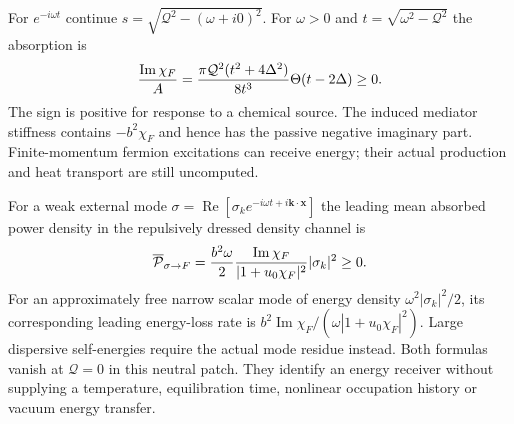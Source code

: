 \documentclass[11pt]{article}
\begin{document}
For $e^{-i\omega t}$ continue
$s=\sqrt{\mathcal Q^2-(\omega+i0)^2}$. For $\omega>0$ and
$t=\sqrt{\omega^2-\mathcal Q^2}$ the absorption is
\begin{equation}
 {\operatorname{Im}\chi_F\over A}
 ={\pi\mathcal Q^2(t^2+4\Delta^2)\over8t^3}
                 \Theta(t-2\Delta)\geq0.
\end{equation}
The sign is positive for response to a chemical source. The induced
mediator stiffness contains $-b^2\chi_F$ and hence has the passive
negative imaginary part. Finite-momentum fermion excitations can receive
energy; their actual production and heat transport are still uncomputed.

For a weak external mode $\sigma=\operatorname{Re}[\sigma_k
e^{-i\omega t+i\mathbf k\cdot\mathbf x}]$ the leading mean absorbed power
density in the repulsively dressed density channel is
\begin{equation}
 \overline{\mathcal P}_{\sigma\to F}
 ={b^2\omega\over2}{\operatorname{Im}\chi_F\over
                    |1+u_0\chi_F|^2}|\sigma_k|^2\geq0.
\end{equation}
For an approximately free narrow scalar mode of energy density
$\omega^2|\sigma_k|^2/2$, its corresponding leading energy-loss rate is
$b^2\operatorname{Im}\chi_F/(\omega|1+u_0\chi_F|^2)$.
Large dispersive self-energies require the actual mode residue instead.
Both formulas vanish at $\mathcal Q=0$ in this neutral patch. They identify
an energy receiver without supplying a temperature, equilibration time,
nonlinear occupation history or vacuum energy transfer.
\end{document}
